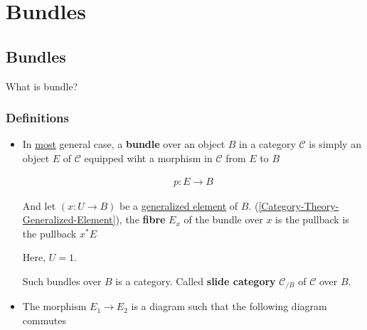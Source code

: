 \documentclass[Total.tex]{subfiles}
\begin{document}
	
	\chapter{Bundles}
	
	\section{Bundles}
	What is bundle?
	
	\subsection{Definitions}
	
	\begin{Def}
		\begin{itemize}
			\item In \underline{most} general case, a \textbf{bundle} over an object $B$ in a category $\mathcal{C}$ is simply an object $E$ of $\mathcal{C}$ equipped wiht a morphism in $\mathcal{C}$ from $E$ to $B$
			
			\begin{gather*}
				p:E\rightarrow B
			\end{gather*}
			
			And let $(x:U\rightarrow B)$ be a \underline{generalized element} of $B$. (\ref{Category-Theory-Generalized-Element}), the \textbf{fibre} $E_x$ of the bundle over $x$ is the pullback is the pullback $x^*E$
			\begin{center}
			\end{center}
			Here, $U=1$.
			
			Such bundles over $B$ is a category. Called \textbf{slide category} $\mathcal{C}_{/B}$ of $\mathcal{C}$ over $B$.
			
			\item The morphism $E_1\rightarrow E_2$ is a diagram such that the following diagram commutes
			\begin{center}
			\end{center}
		\end{itemize}
	\end{Def}
	
\end{document}
